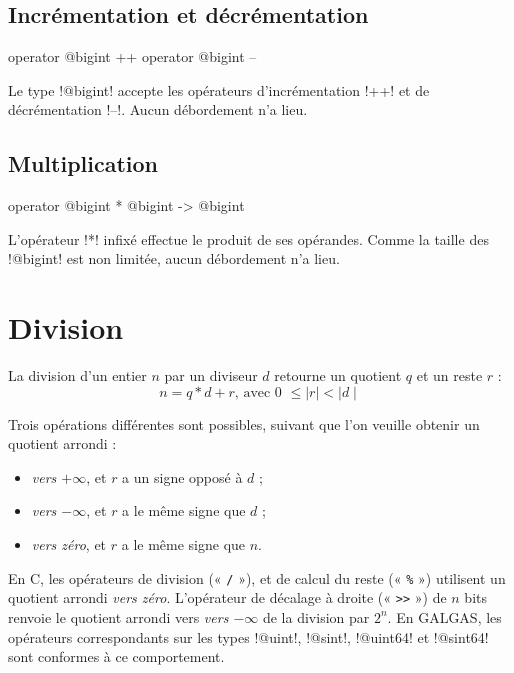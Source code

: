 \subsection{Incrémentation et décrémentation}

\begin{galgas}
operator @bigint ++
operator @bigint --
\end{galgas}

Le type \ggs!@bigint! accepte les opérateurs d'incrémentation \ggs!++! et de décrémentation \ggs!--!. Aucun débordement n'a lieu.

\subsection{Multiplication}

\begin{galgas}
operator @bigint * @bigint -> @bigint
\end{galgas}

L'opérateur \ggs!*! infixé effectue le produit de ses opérandes. Comme la taille des \ggs!@bigint! est non limitée, aucun débordement n'a lieu.




\section{Division}



La division d'un entier $n$ par un diviseur $d$ retourne un quotient $q$ et un reste $r$ :
\begin{equation*}
n = q * d + r\text{, avec 0 } \leqslant \mid r\mid < \mid d\mid
\end{equation*}

Trois opérations différentes sont possibles, suivant que l'on veuille obtenir un quotient arrondi :
\begin{itemize}
\item \emph{vers $+\infty$}, et $r$ a un signe opposé à $d$ ;
\item \emph{vers $-\infty$}, et $r$ a le même signe que $d$ ;
\item \emph{vers zéro}, et $r$ a le même signe que $n$.
\end{itemize}

En C, les opérateurs de division (« \texttt{/} »), et de calcul du reste (« \texttt{\%} ») utilisent un quotient arrondi \emph{vers zéro}. L'opérateur de décalage à droite (« \texttt{>{}>} ») de $n$ bits renvoie le quotient arrondi vers \emph{vers $-\infty$} de la division par $2^n$. En GALGAS, les opérateurs correspondants sur les types \ggs!@uint!, \ggs!@sint!, \ggs!@uint64! et \ggs!@sint64! sont conformes à ce comportement.

